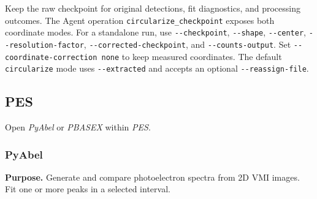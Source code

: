 \documentclass[11pt,a4paper]{article}
\newcommand{\code}[1]{\texttt{#1}}
\begin{document}
Keep the raw checkpoint for original detections, fit diagnostics, and
processing outcomes. The Agent operation
\code{circularize\_\allowbreak{}checkpoint} exposes both coordinate modes.
For a standalone run, use \code{-{}-checkpoint}, \code{-{}-shape},
\code{-{}-center}, \code{-{}-resolution-factor}, \code{-{}-corrected-checkpoint},
and \code{-{}-counts-output}. Set \code{-{}-coordinate-correction none} to
keep measured coordinates. The default \code{circularize} mode uses
\code{-{}-extracted} and accepts an optional \code{-{}-reassign-file}.

\subsection{PES}
\label{sec:pes}

Open \emph{PyAbel} or \emph{PBASEX} within \emph{PES}.

\subsubsection{PyAbel}

\textbf{Purpose.} Generate and compare photoelectron spectra from 2D VMI
images. Fit one or more peaks in a selected interval.
\end{document}
